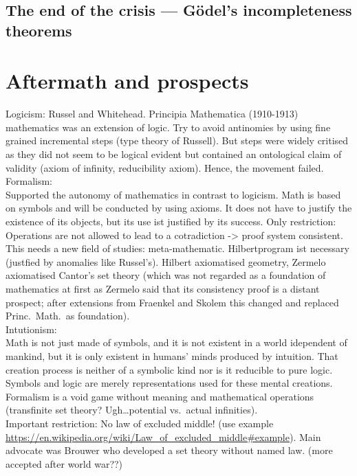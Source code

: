 \documentclass[hidelinks]{article}
\theoremstyle{plain}
\theoremstyle{definition}
\theoremstyle{rem}
\begin{document}
\subsection{The end of the crisis --- Gödel's incompleteness theorems}

\section{Aftermath and prospects}

Logicism:
Russel and Whitehead. Principia Mathematica (1910-1913) mathematics was an extension of logic. Try to avoid antinomies by using fine grained incremental steps (type theory of Russell). But steps were widely critised as they did not seem to be logical evident but contained an ontological claim of validity (axiom of infinity, reducibility axiom). Hence, the movement failed.\\

Formalism:\\
Supported the autonomy of mathematics in contrast to logicism. Math is based on symbols and will be conducted by using axioms. It does not have to justify the existence of its objects, but its use ist justified by its success. Only restriction: Operations are not allowed to lead to a cotradiction -> proof system consistent. This needs a new field of studies: meta-mathematic. Hilbertprogram ist necessary (justfied by anomalies like Russel's). Hilbert axiomatised geometry, Zermelo axiomatised Cantor's set theory (which was not regarded as a foundation of mathematics at first as Zermelo said that its consistency proof is a distant prospect; after extensions from Fraenkel and Skolem this changed and replaced Princ.\ Math.\ as foundation).  \\

Intutionism:\\
Math is not just made of symbols, and it is not existent in a world idependent of mankind, but it is only existent in humans' minds produced by intuition. That creation process is neither of a symbolic kind nor is it reducible to pure logic. Symbols and logic are merely representations used for these mental creations. Formalism is a void game without meaning and mathematical operations (transfinite set theory? Ugh\ldots potential vs.\ actual infinities).\\
Important restriction: No law of excluded middle! (use example \url{https://en.wikipedia.org/wiki/Law\_of\_excluded\_middle#example}). Main advocate was Brouwer who developed a set theory without named law. (more accepted after world war??)\\
\end{document}
